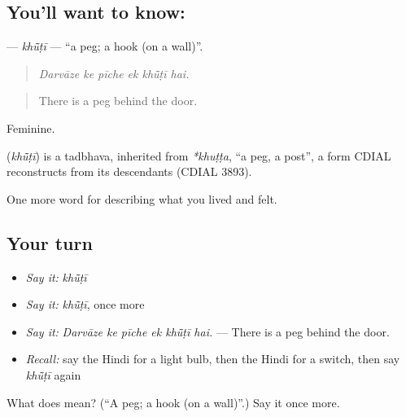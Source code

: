 \subsection*{You'll want to know: }
\textbf{} — \emph{khū̃ṭī} — \textquotedblleft{}a peg; a hook (on a wall)\textquotedblright{}.

\begin{quote}
     
\end{quote}

\begin{quote}
\emph{Darvāze ke pīche ek khū̃ṭī hai.}
\end{quote}

\begin{quote}
There is a peg behind the door.
\end{quote}

Feminine.

\begin{cousinweb}
\textbf{} (\emph{khū̃ṭī}) is a tadbhava, inherited from \emph{*khuṭṭa}, \textquotedblleft{}a peg, a post\textquotedblright{}, a form CDIAL reconstructs from its descendants (CDIAL 3893).
\end{cousinweb}

\begin{grammarlens}[title={What you've built}]
One more word for describing what you lived and felt.
\end{grammarlens}

\subsection*{Your turn}
\begin{itemize}
\raggedright
  \item \emph{Say it:} \emph{khū̃ṭī}
  \item \emph{Say it:} \emph{khū̃ṭī}, once more
  \item \emph{Say it:} \emph{Darvāze ke pīche ek khū̃ṭī hai.} — There is a peg behind the door.
  \item \emph{Recall:} say the Hindi for a light bulb, then the Hindi for a switch, then say \emph{khū̃ṭī} again
\end{itemize}

\begin{tcolorbox}[breakable,colback=teal!4,colframe=teal!35!black,title={Before you move on}]
What does  mean? (\textquotedblleft{}A peg; a hook (on a wall)\textquotedblright{}.) Say it once more.
\end{tcolorbox}
